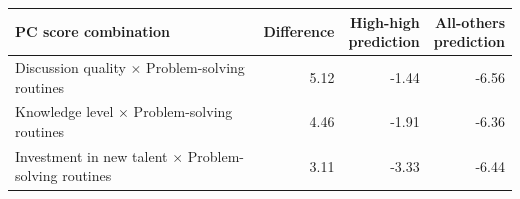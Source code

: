 \begin{table}[h]
\label{tab:pc_score_combo_k2_top3}
\begin{tabular}{p{5.5cm}rrr}
\toprule
PC score combination & Difference & \shortstack{High-high\\prediction} & \shortstack{All-others\\prediction} \\
\midrule
Discussion quality $\times$ Problem-solving routines & 5.12 & -1.44 & -6.56 \\
Knowledge level $\times$ Problem-solving routines & 4.46 & -1.91 & -6.36 \\
Investment in new talent $\times$ Problem-solving routines & 3.11 & -3.33 & -6.44 \\
\bottomrule
\end{tabular}
\end{table}
